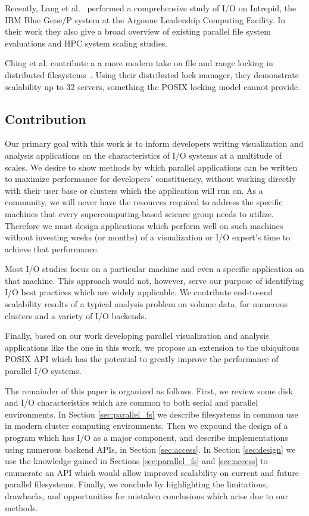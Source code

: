 Recently, Lang et al.~\cite{Lang:2009:IPCA} performed a comprehensive
study of I/O on Intrepid, the IBM Blue Gene/P system at the Argonne
Leadership Computing Facility. In their work they also give a broad
overview of existing parallel file system evaluations and HPC system
scaling studies.

Ching et al. contribute a a more modern take on file and range locking
in distributed filesystems~\cite{Ching:2007:Locking}.  Using their
distributed lock manager, they demonstrate scalability up to 32
servers, something the POSIX locking model cannot provide.

\subsection{Contribution}\label{sec:contribution}

Our primary goal with this work is to inform developers writing
visualization and analysis applications on the characteristics of
I/O systems at a multitude of scales.  We desire to show methods by
which parallel applications can be written to maximize performance for
developers' constituency, without working directly with their user base
or clusters which the application will run on.  As a community, we will
never have the resources required to address the specific machines that
every supercomputing-based science group needs to utilize.  Therefore
we must design applications which perform well on such machines without
investing weeks (or months) of a visualization or I/O expert's time to
achieve that performance.

Most I/O studies focus on a particular machine and even a specific
application on that machine.  This approach would not, however,
serve our purpose of identifying I/O best practices which are widely
applicable.  We contribute end-to-end scalability results of a typical
analysis problem on volume data, for numerous clusters and a variety of
I/O backends.

Finally, based on our work developing parallel visualization and
analysis applications like the one in this work, we propose an
extension to the ubiquitous POSIX API which has the potential to
greatly improve the performance of parallel I/O systems.

The remainder of this paper is organized as follows.  First, we review
some disk and I/O characteristics which are common to both serial and
parallel environments.  In Section \ref{sec:parallel_fs} we describe
filesystems in common use in modern cluster computing environments.
Then we expound the design of a program which has I/O as a major
component, and describe implementations using numerous backend APIs, in
Section \ref{sec:access}.  In Section \ref{sec:design} we use the
knowledge gained in Sections
\ref{sec:parallel_fs} and \ref{sec:access} to enumerate an API which
would allow improved scalability on current and future parallel
filesystems.  Finally, we conclude by highlighting the limitations,
drawbacks, and opportunities for mistaken conclusions which arise due
to our methods.

